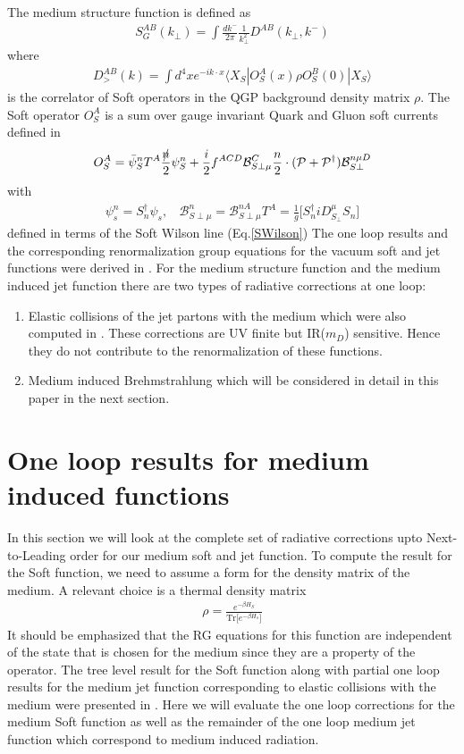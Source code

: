 \documentclass[letter,11pt]{article}
\newcommand{\bea}{\begin{eqnarray}}
\newcommand{\eea}{\end{eqnarray}}
\begin{document}
 The medium structure function is defined as 
\bea
\label{MedSoft}
S_G^{AB}(k_{\perp}) = \int \frac{dk^-}{2\pi}\frac{1}{k_{\perp}^2}D^{AB}(k_{\perp},k^-)
\eea
where
\bea
D_>^{AB}(k) = \int d^4x e^{-i k \cdot x} \langle X_S|O_S^{A}(x)\rho O_S^B(0)|X_S\rangle 
\eea
is the correlator of Soft operators in the QGP background density matrix $\rho$. The Soft operator $O_S^A$ is a sum over gauge invariant Quark and Gluon soft currents defined in \cite{Rothstein:2016bsq}
\bea
O_S^{A} =  \bar{\psi}_S^nT^A\frac{\slashed{n}}{2}\psi_S^n+\frac{i}{2}f^{ACD}\mathcal{B}_{S\perp\mu}^C\frac{n}{2}\cdot(\mathcal{P}+\mathcal{P}^{\dagger})\mathcal{B}_{S\perp}^{n\mu D}
\eea
 with 
\bea
\psi_s^n=S_n^{\dagger}\psi_s, \ \ \ \  \mathcal{B}_{S\perp \mu}^{n} = \mathcal{B}_{S\perp \mu}^{n A}T^A = \frac{1}{g}\Big[S_n^{\dagger}iD_{S_{\perp}}^{\mu}S_n\Big]
\eea
defined in terms of the Soft Wilson line (Eq.\ref{SWilson})
The one loop results and the corresponding renormalization group equations for the vacuum soft and jet functions were derived in \cite{Vaidya:2020lih}. For the medium structure function and the medium induced jet function there are two types of radiative corrections at one loop:
\begin{enumerate}
\item
 Elastic collisions of the jet partons with the medium which were also computed in \cite{Vaidya:2020lih}. These corrections are UV finite  but IR($m_D$) sensitive. Hence they do not contribute to the renormalization of these functions.
\item
Medium induced Brehmstrahlung which will be considered in detail in this paper in the next section.
\end{enumerate}


\section{One loop results for medium induced functions}
\label{sec:Loop}

In this section we will look at the complete set of radiative corrections upto Next-to-Leading order for our medium soft and jet function. To compute the result for the Soft function, we need to assume a form for the density matrix of the medium. A relevant choice is a thermal density matrix 
\bea
\rho = \frac{e^{-\beta H_S}}{\text{Tr}\Big[e^{-\beta H_s}\Big]}
\eea
It should be emphasized that the RG equations for this function are independent of the state that is chosen for the medium since they are a property of the operator.
The tree level result for the Soft function along with  partial one loop results for the medium jet function corresponding to elastic collisions with the medium were presented in \cite{Vaidya:2020lih}. Here we will evaluate the one loop corrections for the medium Soft function as well as the remainder of the one loop medium jet function which correspond to medium induced radiation.
\end{document}

